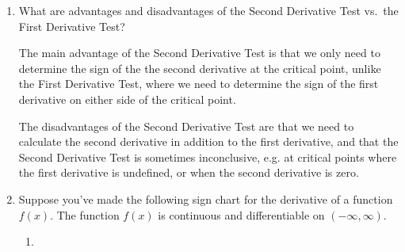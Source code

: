 \documentclass{article}
\begin{document}
\begin{enumerate}[resume]
\item 
  \begin{problem}[\nstretch{0.5}]
    What are advantages and disadvantages of the Second Derivative Test
    vs.\ the First Derivative Test?
  \end{problem}

  \begin{solution}
    The main advantage of the Second Derivative Test is that we only need to determine
    the sign of the
    the second derivative at the critical point, unlike the First Derivative Test,
    where we need to determine the sign of the first derivative on either side of
    the critical point.

    The disadvantages of the Second Derivative Test are that we need to calculate the
    second derivative in addition to the first derivative,
    and that the Second Derivative Test is sometimes
    inconclusive, e.g. at critical points where the first derivative is undefined, 
    or when the second derivative is zero.
  \end{solution}

\item  


  \label{critical-points-reasoning-set2}

  Suppose you've made the following sign chart for the derivative of a
  function $f(x)$.  The function $f(x)$ is continuous and differentiable
  on $(-\infty, \infty)$.
  \begin{center}
  \end{center}

  \begin{enumerate}
  \item



\end{enumerate}
\end{enumerate}
\end{document}
